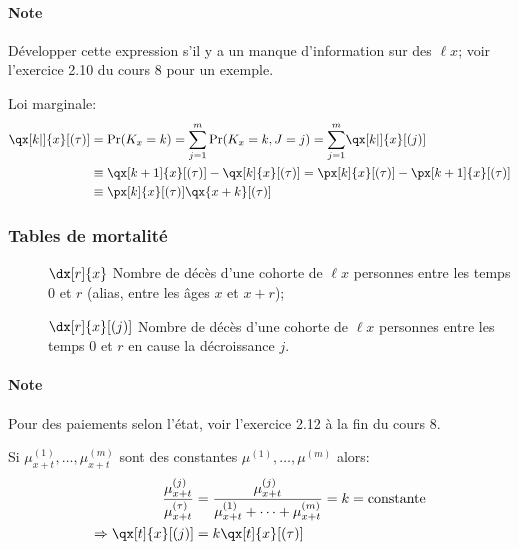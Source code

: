\documentclass[10pt, french]{article}
\begin{document}
\begin{multicols*}{2}
\paragraph{Note}	Développer cette expression s'il y a un manque d'information sur des $\ell{x}$; voir l'exercice 2.10 du cours 8 pour un exemple.

Loi marginale:
\begin{align*}
	\qx[k|]{x}[(\tau)]
	&=	\Pr(K_{x} = k)
	=	\sumz{m}{j = 1} \Pr(K_{x} = k, J = j)
	=	\sumz{m}{j = 1} \qx[k|]{x}[(j)]	\\
	&\equiv	\qx[k + 1]{x}[(\tau)] - \qx[k]{x}[(\tau)]
	=	\px[k]{x}[(\tau)] - \px[k + 1]{x}[(\tau)]	\\
	&\equiv \px[k]{x}[(\tau)] \qx{x + k}[(\tau)]
\end{align*}

\subsubsection*{Tables de mortalité}
\begin{description}
	\item[]	$\dx[r]{x}$	Nombre de décès d'une cohorte de $\ell{x}$ personnes entre les temps 0 et $r$ (alias, entre les âges $x$ et $x + r$);
	\item[]	$\dx[r]{x}[(j)]$	Nombre de décès d'une cohorte de $\ell{x}$ personnes entre les temps 0 et $r$ en cause la décroissance $j$.
\end{description}

\paragraph{Note}	Pour des paiements selon l'état, voir l'exercice 2.12 à la fin du cours 8. 

Si $\mu_{x + t}^{(1)}, \dots, \mu_{x + t}^{(m)}$ sont des constantes $\mu^{(1)}, \dots, \mu^{(m)}$ alors:
\begin{align*}
	\frac{\mu_{x + t}^{(j)}}{\mu_{x + t}^{(\tau)}}
	&=	\frac{\mu_{x + t}^{(j)}}{\mu_{x + t}^{(1)} + \dots + \mu_{x + t}^{(m)}}	
	=	k	
	=	\text{constante}	\\
	\Rightarrow	\qx[t]{x}[(j)]
	&=	k \qx[t]{x}[(\tau)]
\end{align*}

\columnbreak


\end{multicols*}
\end{document}
